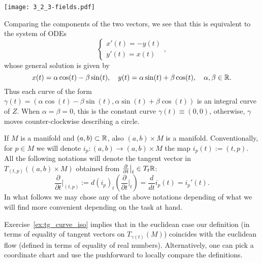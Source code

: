 \begin{example}
\begin{marginfigure}
    \texttt{[image: 3\_2\_3-fields.pdf]}
  \end{marginfigure}
  \noindent Comparing the components of the two vectors, we see that this is equivalent to the system of ODEs
  \begin{equation}
    \begin{cases}
      x'(t) = - y(t)\\
      y'(t) = x(t)
    \end{cases},
  \end{equation}
  whose general solution is given by
  \begin{equation}
    x(t) = \alpha\cos(t) - \beta\sin(t), \quad
    y(t) = \alpha\sin(t) + \beta\cos(t), \quad \alpha,\beta\in\mathbb{R}.
  \end{equation}
  Thus each curve of the form $\gamma(t) = (\alpha\cos(t) -  \beta\sin(t), \alpha\sin(t) + \beta\cos(t))$ is an integral curve of $Z$.
  When $\alpha=\beta=0$, this is the constant curve $\gamma(t)\equiv (0,0)$, otherwise, $\gamma$ moves counter-clockwise describing a circle.
\end{example}

\begin{notation}
  If $M$ is a manifold and $(a,b)\subset\mathbb{R}$, also $(a,b)\times M$ is a manifold. 
  Conventionally, for $p\in M$ we will denote $i_p : (a,b) \to (a,b)\times M$ the map $i_p(t) := (t,p)$.
  All the following notations will denote the tangent vector in $T_{(t,p)}((a,b)\times M)$ obtained from $\frac{\partial}{\partial t}\big|_t \in T_t\mathbb{R}$:
  \begin{equation}
    \frac{\partial}{\partial t}\Big|_{(t,p)} := d (i_p)_t\left(\frac{\partial}{\partial t}\Big|_t\right) = \frac{d}{d t}  i_p(t) = i_p'(t).
  \end{equation}
  In what follows we may chose any of the above notations depending of what we will find more convenient depending on the task at hand.
\end{notation}

Exercise~\ref{ex:tg_curve_iso} implies that in the euclidean case our definition (in terms of equality of tangent vectors on $T_{\gamma(t)}(M)$) coincides with the euclidean flow (defined in terms of equality of real numbers).
Alternatively, one can pick a coordinate chart and use the pushforward to locally compare the definitions.

